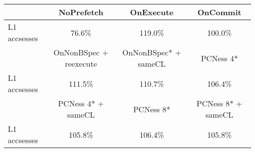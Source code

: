 \begin{tabular}{ l|ccc }
 & NoPrefetch & OnExecute & OnCommit\\ \hline
L1 accsesses & 76.6\% & 119.0\% & 100.0\%\\ \hline
\hline
 & OnNonBSpec + reexecute & OnNonBSpec* + sameCL & PCNess 4*\\ \hline
L1 accsesses & 111.5\% & 110.7\% & 106.4\%\\ \hline
\hline
 & PCNess 4* + sameCL & PCNess 8* & PCNess 8* + sameCL\\ \hline
L1 accsesses & 105.8\% & 106.4\% & 105.8\%\\ \hline
\end{tabular}

